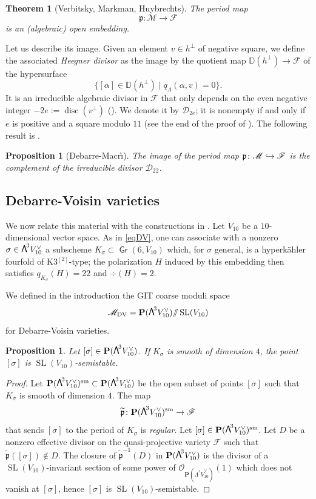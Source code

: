 \documentclass[JEP,XML,SOM,Unicode, NoEqCountersInSection,NoFloatCountersInSection]{cedram}
\let\mathcal\mathscr
\newcommand\hto{\mathrel{\lhook\joinrel\to}}
\newtheorem{theo}[lemm]{Theorem}
\newtheorem{prop}[lemm]{Proposition}
\theoremstyle{definition}
\renewcommand\P{{\mathbf P}}\let\PP\P
\newcommand\mD{\mathbb{D}}
\newcommand\cD{\mathcal{D}}
\newcommand\cF{\mathcal{F}}
\newcommand\cM{\mathcal{M}}
\newcommand\cO{\mathcal{O}}\let\OO\cO
\newcommand\cMDV{\cM_{\mathrm{DV}}}
\DeclareMathOperator{\Gr}{\mathsf{Gr}}
\newcommand\gp{\mathfrak p}
\let\wt\widetilde
\let\dual\vee
\DeclareMathOperator{\disc}{disc}
\DeclareMathOperator{\SL}{SL}
\newcommand\bw[1]{{\hbox{\large$\mathsf{\Lambda}$}^{\!#1}}}
\newcommand\sbw[2]{{{\mathsf{\Lambda}}^{^{\scriptscriptstyle#1}}{#2}}}
\newcommand{\gquot}{/\!\!/}
\newcommand\hk{hyperkähler\xspace}
\begin{document}
\begin{theo}[Verbitsky, Markman, Huybrechts]\label{torth}
The period map
\[
\gp\colon \cM\to \cF
\] is an (algebraic) open embedding.
\end{theo}

Let us describe its image. Given an element $v\in h^\bot$ of negative square, we define the associated \emph{Heegner divisor}
as the image by the quotient map $ \mD(h^\bot)\to\cF$ of the hypersurface
\[
\{[\alpha]\in \mD(h^\bot) \mid q_\Lambda(\alpha, v ) =0\}.
\]
It is an irreducible algebraic divisor in $\cF$ that only depends on the even
negative integer $-2e:=\disc(v^\bot)$ (\cite[Prop.\,4.1(2)(c)]{dm}). We
denote it by $\cD_{2e}$; it is nonempty if and only if $e$ is positive and a
square modulo $11$ (see the end of the proof of \cite[Prop.\,4.1]{dm}). The following result is \cite[Th.\,6.1]{dm}.

\begin{prop}[Debarre-Macr\`\i ]\label{image}
The image of the period map
$\gp\colon \cM\hto \cF
$ is the complement of the irreducible divisor $\cD_{22}$.
\end{prop}

\subsection{Debarre-Voisin varieties}

We now relate this material with the constructions in \cite{devo}. Let $V_{10}$ be a $10$-dimensional vector space. As in \eqref{eqDV}, one can associate with a nonzero
$\sigma\in \bw3V_{10}^\dual$ a subscheme $K_\sigma\subset \Gr(6,V_{10})$ which, for $\sigma$ general, is a
\hk fourfold of K3$^{[2]}$-type; the polarization $H$ induced by this embedding then satisfies $q_{K_\sigma}(H)=22$ and $\div(H)=2$.

We defined in the introduction
the GIT
coarse moduli space
\[
\cMDV=\PP(\bw3 V_{10}^\dual) \gquot \SL(V_{10})
\]
for Debarre-Voisin varieties.

\begin{prop}
Let $[\sigma]\in \PP(\bw3 V_{10}^\dual)$. If $K_{\sigma}$ is smooth of dimension $4$,
the point~$[\sigma]$ is $\SL(V_{10})$-semistable.
\end{prop}

\begin{proof}
Let $\PP(\bw3 V_{10}^\dual)^{\textnormal{sm}}\subset \PP(\bw3 V_{10}^\dual)$ be the open subset of points $[\sigma]$ such that $K_{\sigma}$ is smooth of dimension $4$. The map
\[
\wt{\gp}\colon \PP(\bw3 V_{10}^\dual)^{\textnormal{sm}}
\to \cF
\]
that sends $[\sigma]$ to the period of $K_\sigma$ is \emph{regular}.
Let $[\sigma]\in \PP(\bw3 V_{10}^\dual)^{\textnormal{sm}}$.
Let $D$ be a nonzero effective divisor on the quasi-projective variety $\cF $ such that
$\wt{\gp}([\sigma])\notin D$.
The closure of $ {\wt{\gp}^{-1}(D)}$ in $\PP(\bw3 V_{10}^\dual)$ is the divisor of a $\SL(V_{10})$-invariant section of some power of $\cO_{\P(\sbw3 V_{10}^\dual)}(1)$ which does not vanish at $[\sigma]$, hence $[\sigma]$ is $\SL(V_{10})$-semistable.
\end{proof}
\end{document}
